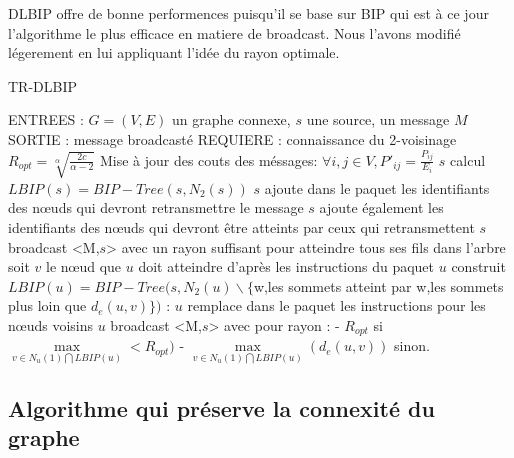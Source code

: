 DLBIP offre de bonne performences puisqu'il se base sur BIP qui est à ce jour l'algorithme le plus efficace en matiere de broadcast.
Nous l'avons modifié légerement en lui appliquant l'idée du rayon optimale.

\begin{algorithm}[H]
\caption{TR-DLBIP}
\label{algo_TRDLBIP}
\begin{algorithmic}
\STATE ENTREES : $G=(V,E)$ un graphe connexe, $s$ une source, un message $M$
\STATE SORTIE : message broadcasté
\STATE REQUIERE : connaissance du 2-voisinage
\STATE $R_{opt}=\sqrt[\alpha]{\frac{2c}{\alpha-2}}$
\STATE Mise à jour des couts des méssages: $ \forall i,j \in V, P'_{ij}=\frac{P_{ij}}{E_i}$
\STATE $s$ calcul $LBIP(s)=BIP-Tree(s,N_2(s))$
\STATE $s$ ajoute dans le paquet les identifiants des nœuds qui devront retransmettre le message
\STATE $s$ ajoute également les identifiants des nœuds qui devront être atteints par ceux qui retransmettent
\STATE $s$ broadcast <M,$s$> avec un rayon suffisant pour atteindre tous ses fils dans l'arbre
		\STATE soit $v$ le nœud que $u$ doit atteindre d'après les instructions du paquet
		\STATE $u$ construit $LBIP(u)=BIP-Tree(s,N_2(u)\backslash \{$w,les sommets atteint par w,les sommets plus loin que $d_e(u,v)\})$ :
			\INDSTATE $u$ remplace dans le paquet les instructions pour les nœuds voisins
			\INDSTATE $u$ broadcast <M,$s$> avec pour rayon : 
			      \INDSTATE[2] - $R_{opt}$ si $\max\limits_{v\in N_u(1)\bigcap LBIP(u)}< R_{opt})$
			      \INDSTATE[2] - $\max\limits_{v\in N_u(1)\bigcap LBIP(u)}(d_e(u,v))$ sinon.
	\ENDIF
\ENDIF
\end{algorithmic}
\end{algorithm}


\subsection{Algorithme qui préserve la connexité du graphe}













